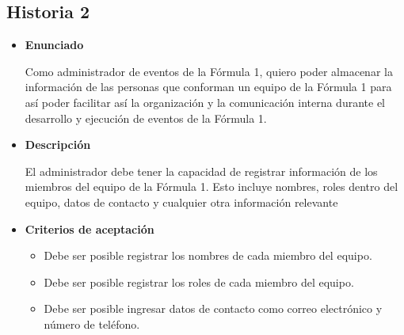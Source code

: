 \documentclass{article}
\begin{document}
	\subsection{Historia 2}
	\begin{itemize}
		
		\item \large{\textbf{Enunciado}}
		\begin{description}
			Como administrador de eventos de la Fórmula 1, quiero poder almacenar la información de las personas que conforman un equipo de la Fórmula 1 para así poder facilitar así la organización y la comunicación interna durante el desarrollo y ejecución de eventos de la Fórmula 1.
		\end{description}
		
		\item \large{\textbf{Descripción}}
		\begin{description}
			El administrador debe tener la capacidad de registrar información de los miembros del equipo de la Fórmula 1. Esto incluye nombres, roles dentro del equipo, datos de contacto y cualquier otra información relevante
		\end{description}
		
		\item \large{\textbf{Criterios de aceptación}}
		\begin{itemize}
			\item Debe ser posible registrar los nombres de cada miembro del equipo.
			\item Debe ser posible registrar los roles de cada miembro del equipo.
			\item Debe ser posible ingresar datos de contacto como correo electrónico y número de teléfono.
		\end{itemize}
		
	\end{itemize}
	
\end{document}
